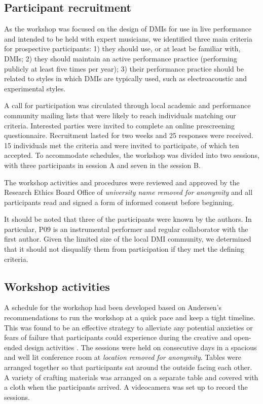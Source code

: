 \documentclass[letterpaper, 12pt]{article}
\begin{document}
\subsection{Participant recruitment}
\label{sec:participant-criteria-and-selection}

As the workshop was focused on the design of DMIs for use in live performance and intended to be held with expert musicians, we identified three main criteria for prospective participants: 1) they should use, or at least be familiar with, DMIs; 2) they should maintain an active performance practice (performing publicly at least five times per year); 3) their performance practice should be related to styles in which DMIs are typically used, such as electroacoustic and experimental styles.

A call for participation was circulated through local academic and performance community mailing lists that were likely to reach individuals matching our criteria. Interested parties were invited to complete an online prescreening questionnaire. Recruitment lasted for two weeks and 25 responses were received. 15 individuals met the criteria and were invited to participate, of which ten accepted. To accommodate schedules, the workshop was divided into two sessions, with three participants in session A and seven in the session B. 

The workshop activities and procedures were reviewed and approved by the Research Ethics Board Office of {\emph{university name removed for anonymity}}
and all participants read and signed a form of informed consent before beginning. 

It should be noted that three of the participants were known by the authors. In particular, P09 is an instrumental performer and regular collaborator with the first author. Given the limited size of the local DMI community, we determined that it should not disqualify them from participation if they met the defining criteria.

\subsection{Workshop activities}
\label{sec:workshop-activities}

A schedule for the workshop had been developed based on Andersen's recommendations to run the workshop at a quick pace and keep a tight timeline. This was found to be an effective strategy to alleviate any potential anxieties or fears of failure that participants could experience during the creative and open-ended design activities \citep{Andersen2017}. The sessions were held on consecutive days in a spacious and well lit conference room at 
{\emph{location removed for anonymity}}.
Tables were arranged together so that participants sat around the outside facing each other. A variety of crafting materials was arranged on a separate table and covered with a cloth when the participants arrived. A videocamera was set up to record the sessions.
\end{document}
